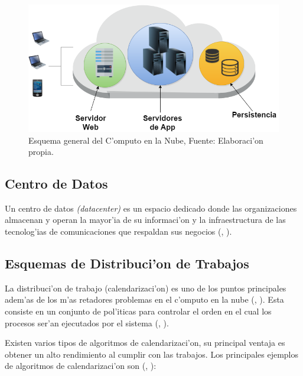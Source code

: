 \setcounter{figure}{1}
\renewcommand\thefigure{\arabic{figure}}
\begin{figure}
	\centering
	\includegraphics[scale=0.5]{media/cloud1}
	\caption{Esquema general del C'omputo en la Nube, Fuente: Elaboraci'on propia.}
\end{figure}


\subsection*{Centro de Datos}
Un centro de datos \textit{(datacenter)} es un espacio dedicado donde las organizaciones almacenan y operan la mayor'ia de su informaci'on y la infraestructura de las tecnolog'ias de comunicaciones que respaldan sus negocios (\citeauthor{whatisdatacenter}, \citeyear{whatisdatacenter}).

\subsection*{Esquemas de Distribuci'on de Trabajos}

La distribuci'on de trabajo (calendarizaci'on) es uno de los puntos principales adem'as de los m'as retadores problemas en el c'omputo en la nube (\citeauthor{li2014greedy}, \citeyear{li2014greedy}). Esta consiste en un conjunto de pol'iticas para controlar el orden en el cual los procesos ser'an ejecutados por el sistema (\citeauthor{agarwal2014efficient}, \citeyear{agarwal2014efficient}).

Existen varios tipos de algoritmos de calendarizaci'on, su principal ventaja es obtener un alto rendimiento al cumplir con las trabajos. Los principales ejemplos de algoritmos de calendarizaci'on son (\citeauthor{salot2013survey}, \citeyear{salot2013survey}):

